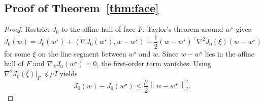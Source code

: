 \documentclass{article}
\theoremstyle{definition}
\newcommand{\norm}[1]{\left\lVert #1 \right\rVert}
\newcommand{\inner}[2]{\left\langle #1, #2 \right\rangle}
\begin{document}
\subsection{Proof of Theorem~\ref{thm:face}}

\begin{proof}
Restrict \(J_0\) to the affine hull of face \(F\). Taylor's theorem around \(w^\star\) gives
\[
J_0(w)
=
J_0(w^\star)
+ \inner{\nabla J_0(w^\star)}{w-w^\star}
+ \frac{1}{2}(w-w^\star)^\top \nabla^2 J_0(\xi)(w-w^\star)
\]
for some \(\xi\) on the line segment between \(w^\star\) and \(w\). Since \(w-w^\star\) lies in the affine hull of \(F\) and \(\nabla_F J_0(w^\star)=0\), the first-order term vanishes. Using \(\nabla^2 J_0(\xi)\vert_F \preceq \mu I\) yields
\[
J_0(w)-J_0(w^\star)
\le
\frac{\mu}{2}\norm{w-w^\star}_2^2.
\]
\end{proof}



\end{document}
